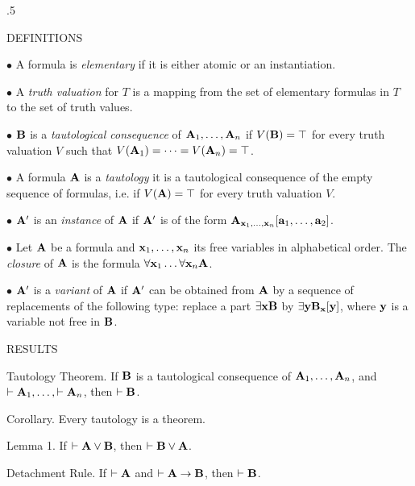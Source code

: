 \vglue .5\baselineskip 

\beginsection DEFINITIONS

\item{$\bullet$} A formula is {\it elementary} if it is either atomic or an instantiation.

\item{$\bullet$} A {\it truth valuation} for $T$ is a mapping from the set of elementary 
formulas in $T$ to the set of truth values.

\item{$\bullet$} ${\bf B}$ is a {\it tautological consequence} of ${\bf A}_1, \dots , {\bf A}_n$ 
if $V({\bf B}) = \top$ for every truth valuation $V$ such that 
$V({\bf A}_1) = \cdots = V({\bf A}_n) = \top$.

\item{$\bullet$} A formula ${\bf A}$ is a {\it tautology} it is a tautological consequence of 
the empty sequence of formulas, i.e. if $V({\bf A}) = \top$ for every truth valuation $V$.

\item{$\bullet$} ${\bf A}'$ is an {\it instance} of ${\bf A}$ if ${\bf A}'$ is of the form ${\bf A}_{{\bf x}_1, \dots, {\bf x}_n}[{\bf a}_1, \dots, {\bf a}_2]$.

\item{$\bullet$} Let ${\bf A}$ be a formula and ${\bf x}_1, \dots, {\bf x}_n$ its free variables in alphabetical order. The {\it closure}
of ${\bf A}$ is the formula $\forall {\bf x}_1 \dots \forall {\bf x}_n {\bf A}$.

\item{$\bullet$} ${\bf A}'$ is a {\it variant} of ${\bf A}$ if ${\bf A}'$ can be obtained from ${\bf A}$ by a sequence of replacements of the
following type: replace a part $\exists {\bf x}{\bf B}$ by $\exists {\bf y}{\bf B}_{\bf x}[{\bf y}]$, where ${\bf y}$ is a variable not free in ${\bf B}$.

\beginsection RESULTS


\proclaim Tautology Theorem. If ${\bf B}$ is a tautological consequence of ${\bf A}_1, \dots, {\bf A}_n$,
and $\vdash{\bf A}_1, \dots, \vdash {\bf A}_n$, then $\vdash {\bf B}$.

\proclaim Corollary. Every tautology is a theorem.

\proclaim Lemma 1. If $\vdash {\bf A} \lor {\bf B}$, then $\vdash {\bf B} \lor {\bf A}$.

\proclaim Detachment Rule. If $\vdash {\bf A}$ and $\vdash {\bf A} \to {\bf B}$, then $\vdash {\bf B}$.


